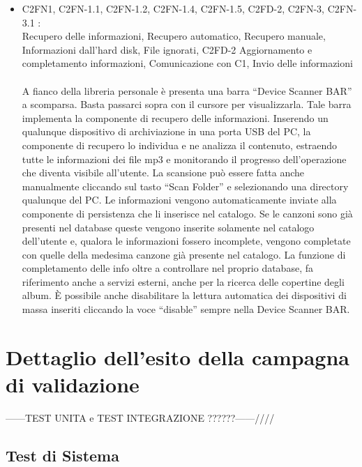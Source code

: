 \begin{itemize}
  \item C2FN1, C2FN-1.1, C2FN-1.2, C2FN-1.4, C2FN-1.5, C2FD-2, C2FN-3,
  C2FN-3.1 :\\
  Recupero delle informazioni, Recupero automatico, Recupero
  manuale, Informazioni dall'hard disk, File ignorati, C2FD-2 Aggiornamento e
  completamento informazioni, Comunicazione con C1, Invio delle informazioni\\
  \\A fianco della libreria personale \`e presenta una barra ``Device Scanner
  BAR'' a scomparsa. Basta passarci sopra con il cursore per visualizzarla. Tale
  barra implementa la componente di recupero delle informazioni. 
  Inserendo un qualunque dispositivo di archiviazione in una porta
  USB del PC, la componente di recupero lo individua e ne analizza il
  contenuto, estraendo tutte le informazioni dei file mp3 e monitorando il
  progresso dell'operazione che diventa visibile all'utente. La
  scansione pu\`o essere fatta anche manualmente cliccando sul tasto ``Scan
  Folder'' e selezionando una directory qualunque del PC. Le informazioni vengono automaticamente inviate alla 
  componente di persistenza che li inserisce nel catalogo. Se le canzoni sono
  gi\`a presenti nel database queste vengono inserite solamente nel catalogo
  dell'utente e, qualora le informazioni fossero incomplete, vengono completate
  con quelle della medesima canzone gi\`a presente nel catalogo. La funzione di
  completamento delle info oltre a controllare nel proprio database, fa
  riferimento anche a servizi esterni, anche per la ricerca delle copertine
  degli album. \`E possibile anche disabilitare la lettura automatica dei
  dispositivi di massa inseriti cliccando la voce ``disable'' sempre nella Device Scanner BAR.
  
\end{itemize}


\section{Dettaglio dell'esito della campagna di validazione}
------TEST UNITA e TEST INTEGRAZIONE ??????------////

\subsection{Test di Sistema}

